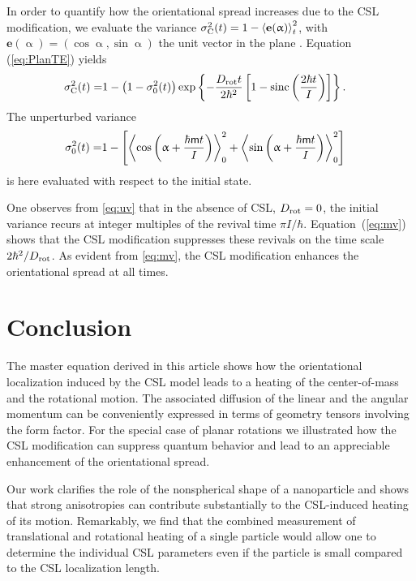 \documentclass[%
 twocolumn,
 amsmath,amssymb,
 aps,
 pra,
]{revtex4-1}
\newcommand{\op}[1]{{\sf #1}}
\begin{document}
In order to quantify how the orientational spread increases due to the CSL modification, we evaluate the variance $\sigma^2_{\rm C}(t) = 1 - \left \langle \textbf{e}(\upalpha) \right \rangle_t^2$, with $\textbf{e}(\upalpha) = (\cos \upalpha,\sin \upalpha)$ the unit vector in the plane \cite{fischer2014decoherence}. Equation (\ref{eq:PlanTE}) yields
\begin{align}
{\sigma_{\rm C}^2}(t) =& 1-\left(1-\sigma^2_0(t)\right)\exp\left\{-\frac{D_{\rm rot}t}{2\hbar^2}\left[1-{\rm sinc}\left(\frac{2\hbar t}{I}\right)\right]\right\}.
\label{eq:mv}
\end{align}
The unperturbed variance 
\begin{align}
{\sigma_0^2}(t) =& 1-\left[\left<\cos\left(\upalpha+\frac{\hbar\op{m}t}{I}\right)\right>^2_0+\left<\sin\left(\upalpha+\frac{\hbar\op{m}t}{I}\right)\right>^2_0\right]
\label{eq:uv}
\end{align}
is here evaluated with respect to the initial state.

One observes from \eqref{eq:uv} that in the absence of CSL, $D_{\rm rot} = 0$, the initial variance recurs at integer multiples of the revival time $\pi I/\hbar$. Equation~(\ref{eq:mv}) shows that the CSL modification suppresses these revivals on the time scale $2\hbar^2/D_{\rm rot}$. As evident from \eqref{eq:mv}, the CSL modification enhances the orientational spread at all times. 

\section{Conclusion}

The master equation derived in this article shows how the
orientational localization induced by the CSL model leads to a heating of the center-of-mass and the rotational motion. The associated diffusion of the linear and the angular momentum can be conveniently expressed in terms of geometry tensors involving the form factor. For the special case of planar rotations we illustrated how the CSL modification can suppress quantum behavior and lead to an appreciable enhancement of the orientational spread.

Our work clarifies the role of the nonspherical shape of a nanoparticle and shows that strong anisotropies can contribute  substantially to the CSL-induced heating of its motion.
Remarkably, we find that the combined measurement of translational and rotational heating of a single particle would allow one to determine the individual CSL parameters even if the particle is small compared to the CSL localization length.
\end{document}
